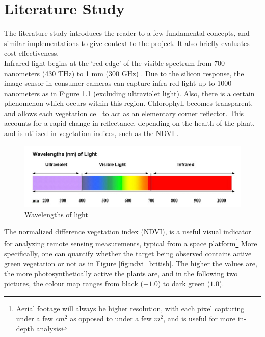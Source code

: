 \chapter{Literature Study}
\label{sec:lit}

The literature study introduces the reader to a few fundamental concepts, and similar implementations to give context to the project. It also briefly evaluates cost effectiveness.\\

Infrared light begins at the `red edge' of the visible spectrum from 700 nanometers (430 THz) to 1 mm (300 GHz) \cite{ir_wiki}. Due to the silicon response, the image sensor in consumer cameras can capture infra-red light up to 1000 nanometers \cite{ir_wiki} as in Figure \ref{fig:ir_spectrum} (excluding ultraviolet light). Also, there is a certain phenomenon which occurs within this region. Chlorophyll becomes transparent, and allows each vegetation cell to act as an elementary corner reflector. This accounts for a rapid change in reflectance, depending on the health of the plant, and is utilized in vegetation indices, such as the NDVI \cite{red_edge}.

\begin{figure}[H]
\centering
\includegraphics[scale=0.35]{images/ir_spectrum.png}
\caption{Wavelengths of light \cite{ir_spectrum}}
\label{fig:ir_spectrum}
\end{figure}


The normalized difference vegetation index (NDVI), is a useful visual indicator for analyzing remote sensing measurements, typical from a space platform\footnote{Aerial footage will always be higher resolution, with each pixel capturing under a few $cm^2$ as opposed to under a few $m^2$, and is useful for more in-depth analysis} More specifically, one can quantify whether the target being observed contains active green vegetation or not\cite{ndvi_wiki} as in Figure \ref{fig:ndvi_british}. The higher the values are, the more photosynthetically active the plants are, and in the following two pictures, the colour map ranges from black ($-1.0$) to dark green ($1.0$).

